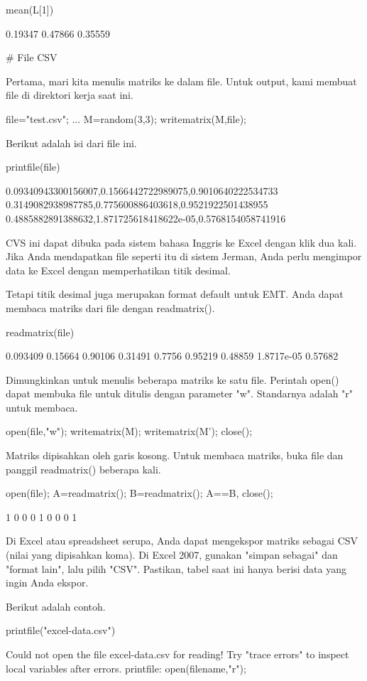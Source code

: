 \documentclass{article}
\begin{document}
\>mean(L[1])


      0.19347 
      0.47866 
      0.35559 

# File CSV

Pertama, mari kita menulis matriks ke dalam file. Untuk output, kami
membuat file di direktori kerja saat ini.


\>file="test.csv";  ...  
\>   M=random(3,3); writematrix(M,file);


Berikut adalah isi dari file ini.


\>printfile(file)


    0.09340943300156007,0.1566442722989075,0.9010640222534733
    0.3149082938987785,0.775600886403618,0.9521922501438955
    0.4885882891388632,1.871725618418622e-05,0.5768154058741916
    

CVS ini dapat dibuka pada sistem bahasa Inggris ke Excel dengan klik
dua kali. Jika Anda mendapatkan file seperti itu di sistem Jerman,
Anda perlu mengimpor data ke Excel dengan memperhatikan titik desimal.


Tetapi titik desimal juga merupakan format default untuk EMT. Anda
dapat membaca matriks dari file dengan readmatrix().


\>readmatrix(file)


     0.093409   0.15664   0.90106 
      0.31491    0.7756   0.95219 
      0.48859 1.8717e-05   0.57682 

Dimungkinkan untuk menulis beberapa matriks ke satu file. Perintah
open() dapat membuka file untuk ditulis dengan parameter "w".
Standarnya adalah "r" untuk membaca.


\>open(file,"w"); writematrix(M); writematrix(M'); close();


Matriks dipisahkan oleh garis kosong. Untuk membaca matriks, buka file
dan panggil readmatrix() beberapa kali.


\>open(file); A=readmatrix(); B=readmatrix(); A==B, close();


            1         0         0 
            0         1         0 
            0         0         1 

Di Excel atau spreadsheet serupa, Anda dapat mengekspor matriks
sebagai CSV (nilai yang dipisahkan koma). Di Excel 2007, gunakan
"simpan sebagai" dan "format lain", lalu pilih "CSV". Pastikan, tabel
saat ini hanya berisi data yang ingin Anda ekspor.


Berikut adalah contoh.


\>printfile("excel-data.csv")


    Could not open the file
    excel-data.csv
    for reading!
    Try "trace errors" to inspect local variables after errors.
    printfile:
        open(filename,"r");
\end{document}
